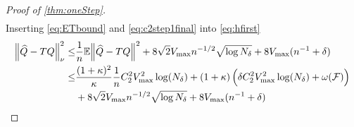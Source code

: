 \begin{proof}[Proof of \cref{thm:oneStep}]
\begin{align}
    \label{eq:ETbound}
  \end{align}
  Inserting \cref{eq:ETbound} and \cref{eq:c2step1final} into \cref{eq:hfirst}
  \begin{align}
    \norm{\widehat{Q} - TQ}^2_\nu \leq & \frac{1}{n} \mathbb{E} \norm{\widehat{Q} - TQ}^2
    + 8 \sqrt{2} V_{\max} n^{-1/2} \sqrt{\log N_\delta}
    + 8 V_{\max} (n^{-1} + \delta)
    \\ \leq & \frac{(1+\kappa)^2}{\kappa} \frac{1}{n}
    C_2^2 V_{\max}^2 \log(N_\delta)
    + (1 + \kappa) \left( \delta C_2^2 V_{\max}^2 \log(N_\delta)
    + \omega(\mathcal{F}) \right) 
    \notag
    \\ & + 8 \sqrt{2} V_{\max} n^{-1/2} \sqrt{\log N_\delta}
    + 8 V_{\max} (n^{-1} + \delta)
    \label{eq:C2final}
  \end{align}
\end{proof}



